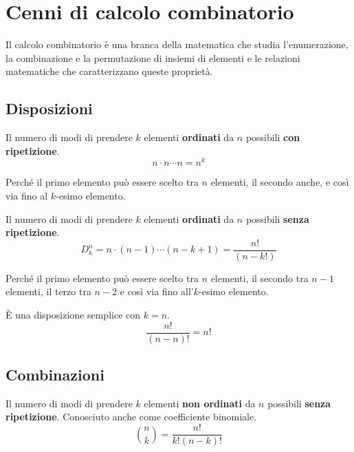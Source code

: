 \chapter{Cenni di calcolo combinatorio}
Il calcolo combinatorio è una branca della matematica che studia l'enumerazione, la combinazione e la permutazione di insiemi di elementi e le relazioni matematiche che caratterizzano queste proprietà.
\section{Disposizioni} %
\begin{definition}
  Il numero di modi di prendere \( k \) elementi \textbf{ordinati} da \( n \) possibili \textbf{con ripetizione}.
  \[ n \cdot n \cdots n = n^k \]
\end{definition}
Perché il primo elemento può essere scelto tra \( n \) elementi, il secondo anche, e così via fino al \( k \)-esimo elemento.

\begin{definition}
  \label{def:disposizione_semplice}
  Il numero di modi di prendere \( k \) elementi \textbf{ordinati} da \( n \) possibili \textbf{senza ripetizione}.
  \[ D_k^n = n \cdot (n - 1) \cdots (n - k + 1) = \frac{n!}{(n-k!)} \]
\end{definition}
Perché il primo elemento può essere scelto tra \( n \) elementi, il secondo tra \( n - 1 \) elementi, il terzo tra \( n - 2 \) e così via fino all'\( k \)-esimo elemento.

\begin{definition}[Permutazione]
  È una disposizione semplice con \( k = n \).
  \[ \frac{n!}{(n - n)!} = n! \]
\end{definition}


\section{Combinazioni} %
\begin{definition}
  \label{def:combinazione_semplice}
  Il numero di modi di prendere \( k \) elementi \textbf{non ordinati} da \( n \) possibili \textbf{senza ripetizione}. Conosciuto anche come coefficiente binomiale.
  \[ \binom{n}{k} = \frac{n!}{k!(n-k)!} \]
\end{definition}

